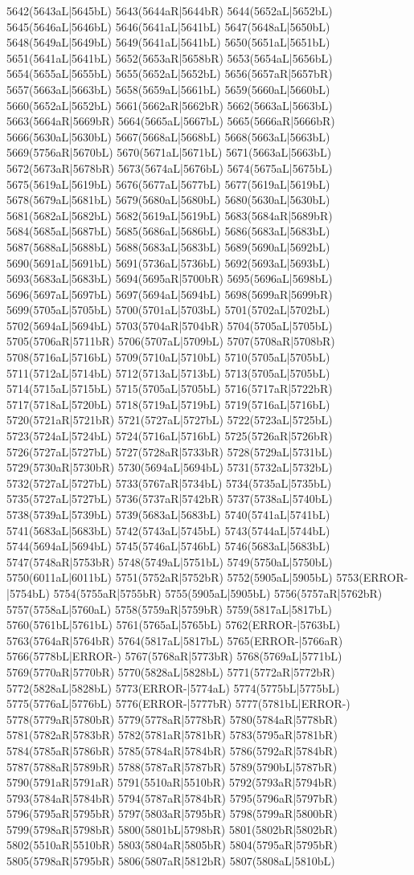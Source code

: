 5642(5643aL|5645bL) 5643(5644aR|5644bR) 5644(5652aL|5652bL) 5645(5646aL|5646bL) 5646(5641aL|5641bL) 5647(5648aL|5650bL) 5648(5649aL|5649bL) 5649(5641aL|5641bL) 5650(5651aL|5651bL) 5651(5641aL|5641bL) 5652(5653aR|5658bR) 5653(5654aL|5656bL) 5654(5655aL|5655bL) 5655(5652aL|5652bL) 5656(5657aR|5657bR) 5657(5663aL|5663bL) 5658(5659aL|5661bL) 5659(5660aL|5660bL) 5660(5652aL|5652bL) 5661(5662aR|5662bR) 5662(5663aL|5663bL) 5663(5664aR|5669bR) 5664(5665aL|5667bL) 5665(5666aR|5666bR) 5666(5630aL|5630bL) 5667(5668aL|5668bL) 5668(5663aL|5663bL) 5669(5756aR|5670bL) 5670(5671aL|5671bL) 5671(5663aL|5663bL) 5672(5673aR|5678bR) 5673(5674aL|5676bL) 5674(5675aL|5675bL) 5675(5619aL|5619bL) 5676(5677aL|5677bL) 5677(5619aL|5619bL) 5678(5679aL|5681bL) 5679(5680aL|5680bL) 5680(5630aL|5630bL) 5681(5682aL|5682bL) 5682(5619aL|5619bL) 5683(5684aR|5689bR) 5684(5685aL|5687bL) 5685(5686aL|5686bL) 5686(5683aL|5683bL) 5687(5688aL|5688bL) 5688(5683aL|5683bL) 5689(5690aL|5692bL) 5690(5691aL|5691bL) 5691(5736aL|5736bL) 5692(5693aL|5693bL) 5693(5683aL|5683bL) 5694(5695aR|5700bR) 5695(5696aL|5698bL) 5696(5697aL|5697bL) 5697(5694aL|5694bL) 5698(5699aR|5699bR) 5699(5705aL|5705bL) 5700(5701aL|5703bL) 5701(5702aL|5702bL) 5702(5694aL|5694bL) 5703(5704aR|5704bR) 5704(5705aL|5705bL) 5705(5706aR|5711bR) 5706(5707aL|5709bL) 5707(5708aR|5708bR) 5708(5716aL|5716bL) 5709(5710aL|5710bL) 5710(5705aL|5705bL) 5711(5712aL|5714bL) 5712(5713aL|5713bL) 5713(5705aL|5705bL) 5714(5715aL|5715bL) 5715(5705aL|5705bL) 5716(5717aR|5722bR) 5717(5718aL|5720bL) 5718(5719aL|5719bL) 5719(5716aL|5716bL) 5720(5721aR|5721bR) 5721(5727aL|5727bL) 5722(5723aL|5725bL) 5723(5724aL|5724bL) 5724(5716aL|5716bL) 5725(5726aR|5726bR) 5726(5727aL|5727bL) 5727(5728aR|5733bR) 5728(5729aL|5731bL) 5729(5730aR|5730bR) 5730(5694aL|5694bL) 5731(5732aL|5732bL) 5732(5727aL|5727bL) 5733(5767aR|5734bL) 5734(5735aL|5735bL) 5735(5727aL|5727bL) 5736(5737aR|5742bR) 5737(5738aL|5740bL) 5738(5739aL|5739bL) 5739(5683aL|5683bL) 5740(5741aL|5741bL) 5741(5683aL|5683bL) 5742(5743aL|5745bL) 5743(5744aL|5744bL) 5744(5694aL|5694bL) 5745(5746aL|5746bL) 5746(5683aL|5683bL) 5747(5748aR|5753bR) 5748(5749aL|5751bL) 5749(5750aL|5750bL) 5750(6011aL|6011bL) 5751(5752aR|5752bR) 5752(5905aL|5905bL) 5753(ERROR-|5754bL) 5754(5755aR|5755bR) 5755(5905aL|5905bL) 5756(5757aR|5762bR) 5757(5758aL|5760aL) 5758(5759aR|5759bR) 5759(5817aL|5817bL) 5760(5761bL|5761bL) 5761(5765aL|5765bL) 5762(ERROR-|5763bL) 5763(5764aR|5764bR) 5764(5817aL|5817bL) 5765(ERROR-|5766aR) 5766(5778bL|ERROR-) 5767(5768aR|5773bR) 5768(5769aL|5771bL) 5769(5770aR|5770bR) 5770(5828aL|5828bL) 5771(5772aR|5772bR) 5772(5828aL|5828bL) 5773(ERROR-|5774aL) 5774(5775bL|5775bL) 5775(5776aL|5776bL) 5776(ERROR-|5777bR) 5777(5781bL|ERROR-) 5778(5779aR|5780bR) 5779(5778aR|5778bR) 5780(5784aR|5778bR) 5781(5782aR|5783bR) 5782(5781aR|5781bR) 5783(5795aR|5781bR) 5784(5785aR|5786bR) 5785(5784aR|5784bR) 5786(5792aR|5784bR) 5787(5788aR|5789bR) 5788(5787aR|5787bR) 5789(5790bL|5787bR) 5790(5791aR|5791aR) 5791(5510aR|5510bR) 5792(5793aR|5794bR) 5793(5784aR|5784bR) 5794(5787aR|5784bR) 5795(5796aR|5797bR) 5796(5795aR|5795bR) 5797(5803aR|5795bR) 5798(5799aR|5800bR) 5799(5798aR|5798bR) 5800(5801bL|5798bR) 5801(5802bR|5802bR) 5802(5510aR|5510bR) 5803(5804aR|5805bR) 5804(5795aR|5795bR) 5805(5798aR|5795bR) 5806(5807aR|5812bR) 5807(5808aL|5810bL) 